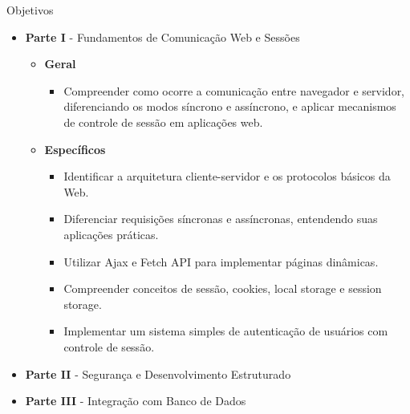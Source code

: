 \documentclass{beamer}
\begin{document}
\begin{frame}{Objetivos}
    \begin{itemize}
        \justifying
        \item \textbf{Parte I} - Fundamentos de Comunicação Web e Sessões
            \begin{itemize}
                \item \textbf{Geral}
                    \begin{itemize}
                        \justifying
                        \item Compreender como ocorre a comunicação entre navegador e servidor, diferenciando os modos síncrono e assíncrono, e aplicar mecanismos de controle de sessão em aplicações web.
                    \end{itemize}
                \item \textbf{Específicos}
                    \begin{itemize}
                        \justifying
                        \item Identificar a arquitetura cliente-servidor e os protocolos básicos da Web.
                        \item Diferenciar requisições síncronas e assíncronas, entendendo suas aplicações práticas.
                        \item Utilizar Ajax e Fetch API para implementar páginas dinâmicas.
                        \item Compreender conceitos de sessão, cookies, local storage e session storage.
                        \item Implementar um sistema simples de autenticação de usuários com controle de sessão.
                    \end{itemize}
            \end{itemize}
        \item \textbf{Parte II} - Segurança e Desenvolvimento Estruturado
        \item \textbf{Parte III} - Integração com Banco de Dados
    \end{itemize}
\end{frame}
\end{document}

